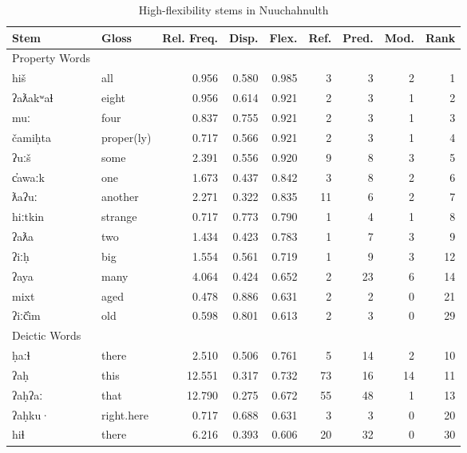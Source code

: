 \begin{table}
  \centering
  \caption{High-flexibility stems in Nuuchahnulth}
  \label{tab:Nuuchahnulth-high-flexibility}
  \begin{tabular}{ l l r r r r r r r }
    \toprule
    Stem & Gloss & Rel. Freq. & Disp. & Flex. & Ref. & Pred. & Mod. & Rank\\

    \midrule
    Property Words\\
    \midrule
    hiš      & all        & 0.956 & 0.580 & 0.985 &  3 &  3 & 2 &  1\\
    ʔaƛakʷaɬ & eight      & 0.956 & 0.614 & 0.921 &  2 &  3 & 1 &  2\\
    muː      & four       & 0.837 & 0.755 & 0.921 &  2 &  3 & 1 &  3\\
    čamiḥta  & proper(ly) & 0.717 & 0.566 & 0.921 &  2 &  3 & 1 &  4\\
    ʔuːš     & some       & 2.391 & 0.556 & 0.920 &  9 &  8 & 3 &  5\\
    c̓awaːk   & one        & 1.673 & 0.437 & 0.842 &  3 &  8 & 2 &  6\\
    ƛaʔuː    & another    & 2.271 & 0.322 & 0.835 & 11 &  6 & 2 &  7\\
    hiːtkin  & strange    & 0.717 & 0.773 & 0.790 &  1 &  4 & 1 &  8\\
    ʔaƛa     & two        & 1.434 & 0.423 & 0.783 &  1 &  7 & 3 &  9\\
    ʔiːḥ     & big        & 1.554 & 0.561 & 0.719 &  1 &  9 & 3 & 12\\
    ʔaya     & many       & 4.064 & 0.424 & 0.652 &  2 & 23 & 6 & 14\\
    mixt     & aged       & 0.478 & 0.886 & 0.631 &  2 &  2 & 0 & 21\\
    ʔiːč̓im   & old        & 0.598 & 0.801 & 0.613 &  2 &  3 & 0 & 29\\

    \midrule
    Deictic Words\\
    \midrule
    ḥaːɬ   & there      &  2.510 & 0.506 & 0.761 &  5 & 14 &  2 & 10\\
    ʔaḥ    & this       & 12.551 & 0.317 & 0.732 & 73 & 16 & 14 & 11\\
    ʔaḥʔaː & that       & 12.790 & 0.275 & 0.672 & 55 & 48 &  1 & 13\\
    ʔaḥku· & right.here &  0.717 & 0.688 & 0.631 &  3 &  3 &  0 & 20\\
    hiɬ    & there      &  6.216 & 0.393 & 0.606 & 20 & 32 &  0 & 30\\

    \bottomrule
  \end{tabular}
\end{table}

